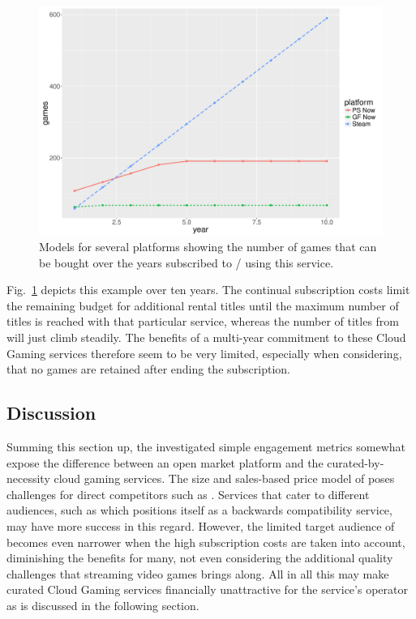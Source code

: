\begin{figure}[!t]
	\centering
	\includegraphics[width=1.0\columnwidth]{images/games-over-year.pdf}
	\caption{Models for several platforms showing the number of games that can be bought over the years subscribed to / using this service.}
\label{fig:games-over-years}
\end{figure}

Fig.~\ref{fig:games-over-years} depicts this example over ten years. The continual subscription costs limit the remaining budget for additional rental titles until the maximum number of titles is reached with that particular service, whereas the number of titles from \steam will just climb steadily. The benefits of a multi-year commitment to these Cloud Gaming services therefore seem to be very limited, especially when considering, that no games are retained after ending the subscription.


\subsection{Discussion}

Summing this section up, the investigated simple engagement metrics somewhat expose the difference between an open market platform and the curated-by-necessity cloud gaming services. The size and sales-based price model of \steam poses challenges for direct competitors such as \gfnow. Services that cater to different audiences, such as \psnow which positions itself as a backwards compatibility service, may have more success in this regard. However, the limited target audience of \psnow becomes even narrower when the high subscription costs are taken into account, diminishing the benefits for many, not even considering the additional quality challenges that streaming video games brings along. All in all this may make curated Cloud Gaming services financially unattractive for the service's operator as is discussed in the following section.

